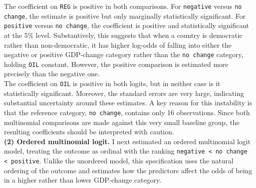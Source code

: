 \documentclass[12pt,letterpaper]{article}
\begin{document}
\noindent The coefficient on \texttt{REG} is positive in both comparisons. For \texttt{negative} versus \texttt{no change}, the estimate is positive but only marginally statistically significant. For \texttt{positive} versus \texttt{no change}, the coefficient is positive and statistically significant at the 5\% level. Substantively, this suggests that when a country is democratic rather than non-democratic, it has higher log-odds of falling into either the negative or positive GDP-change category rather than the \texttt{no change} category, holding \texttt{OIL} constant. However, the positive comparison is estimated more precisely than the negative one.\\

\noindent The coefficient on \texttt{OIL} is positive in both logits, but in neither case is it statistically significant. Moreover, the standard errors are very large, indicating substantial uncertainty around these estimates. A key reason for this instability is that the reference category, \texttt{no change}, contains only 16 observations. Since both multinomial comparisons are made against this very small baseline group, the resulting coefficients should be interpreted with caution.\\

\noindent \textbf{(2) Ordered multinomial logit.}
I next estimated an ordered multinomial logit model, treating the outcome as ordinal with the ranking \texttt{negative < no change < positive}. Unlike the unordered model, this specification uses the natural ordering of the outcome and estimates how the predictors affect the odds of being in a higher rather than lower GDP-change category.\\
\end{document}
